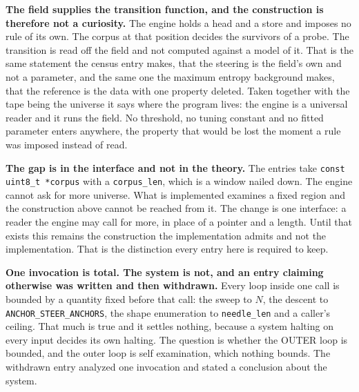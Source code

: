 \textbf{The field supplies the transition function, and the construction is therefore not a curiosity.} The engine holds a head and a store and imposes no rule of its own. The corpus at that position decides the survivors of a probe. The transition is read off the field and not computed against a model of it. That is the same statement the census entry makes, that the steering is the field's own and not a parameter, and the same one the maximum entropy background makes, that the reference is the data with one property deleted. Taken together with the tape being the universe it says where the program lives: the engine is a universal reader and it runs the field. No threshold, no tuning constant and no fitted parameter enters anywhere, the property that would be lost the moment a rule was imposed instead of read.

\textbf{The gap is in the interface and not in the theory.} The entries take \texttt{const uint8\_t *corpus} with a \texttt{corpus\_len}, which is a window nailed down. The engine cannot ask for more universe. What is implemented examines a fixed region and the construction above cannot be reached from it. The change is one interface: a reader the engine may call for more, in place of a pointer and a length. Until that exists this remains the construction the implementation admits and not the implementation. That is the distinction every entry here is required to keep.

\textbf{One invocation is total. The system is not, and an entry claiming otherwise was written and then withdrawn.} Every loop inside one call is bounded by a quantity fixed before that call: the sweep to \(N\), the descent to \texttt{ANCHOR\_STEER\_ANCHORS}, the shape enumeration to \texttt{needle\_len} and a caller's ceiling. That much is true and it settles nothing, because a system halting on every input decides its own halting. The question is whether the OUTER loop is bounded, and the outer loop is self examination, which nothing bounds. The withdrawn entry analyzed one invocation and stated a conclusion about the system.

